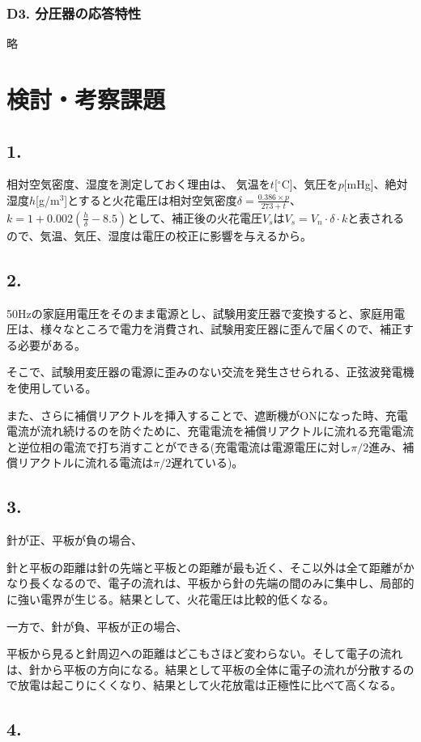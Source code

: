 \documentclass[dvipdfmx, twocolumn]{jsarticle}
\begin{document}
\subsubsection*{D3. 分圧器の応答特性}
略

\section{検討・考察課題}
\subsection*{1.}
相対空気密度、湿度を測定しておく理由は、
気温を$t$[$^\circ$C]、気圧を$p$[mHg]、絶対湿度$h$[g/m$^{3}$]とすると火花電圧は相対空気密度$\delta = \frac{0.386\times p}{273+t}$、$k = 1 + 0.002\left(\frac{h}{\delta} - 8.5\right)$として、補正後の火花電圧$V_{s}$は$V_{s} = V_{n}\cdot \delta \cdot k$と表されるので、気温、気圧、湿度は電圧の校正に影響を与えるから。

\subsection*{2.}
50Hzの家庭用電圧をそのまま電源とし、試験用変圧器で変換すると、家庭用電圧は、様々なところで電力を消費され、試験用変圧器に歪んで届くので、補正する必要がある。

そこで、試験用変圧器の電源に歪みのない交流を発生させられる、正弦波発電機を使用している。


また、さらに補償リアクトルを挿入することで、遮断機がONになった時、充電電流が流れ続けるのを防ぐために、充電電流を補償リアクトルに流れる充電電流と逆位相の電流で打ち消すことができる(充電電流は電源電圧に対し$\pi /2$進み、補償リアクトルに流れる電流は$\pi /2$遅れている)。
\subsection*{3.}
針が正、平板が負の場合、

針と平板の距離は針の先端と平板との距離が最も近く、そこ以外は全て距離がかなり長くなるので、電子の流れは、平板から針の先端の間のみに集中し、局部的に強い電界が生じる。結果として、火花電圧は比較的低くなる。

一方で、針が負、平板が正の場合、

平板から見ると針周辺への距離はどこもさほど変わらない。そして電子の流れは、針から平板の方向になる。結果として平板の全体に電子の流れが分散するので放電は起こりにくくなり、結果として火花放電は正極性に比べて高くなる。
\subsection*{4.}
\end{document}
